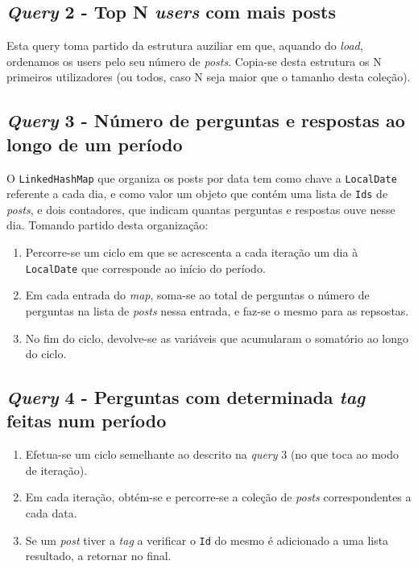 \documentclass[10pt]{article}
\begin{document}
	\subsection*{\textit{Query} 2 - Top N \textit{users} com mais posts}
			Esta query toma partido da estrutura auziliar em que,
		aquando do \textit{load}, ordenamos os users pelo seu 
		número de \textit{posts}. Copia-se desta estrutura os 
		N primeiros utilizadores (ou todos, caso N seja maior
		que o tamanho desta coleção).			
	\subsection*{\textit{Query} 3 - Número de perguntas e respostas ao longo de um período}
			O \texttt{LinkedHashMap} que organiza os posts por data
		tem como chave a \texttt{LocalDate} referente a cada dia, e 
		como valor um objeto que contém uma lista de \texttt{Ids} de
		\textit{posts}, e dois contadores, que indicam quantas 
		perguntas e respostas ouve nesse dia. Tomando partido desta 
		organização:
		\begin{enumerate}
			\item Percorre-se um ciclo em que se acrescenta a cada 
		iteração um dia à \texttt{LocalDate} que corresponde ao 
		início do período.
			\item Em cada entrada do \textit{map}, soma-se ao total
		de perguntas o número de perguntas na lista de \textit{posts} 
		nessa entrada, e faz-se o mesmo para as repsostas.
			\item No fim do ciclo, devolve-se as variáveis que 
		acumularam o somatório ao longo do ciclo.
		\end{enumerate}
	\subsection*{\textit{Query} 4 - Perguntas com determinada \textit{tag} feitas num período}
		\begin{enumerate}
			\item Efetua-se um ciclo semelhante ao descrito na 
		\textit{query} 3 (no que toca ao modo de iteração).
			\item Em cada iteração, obtém-se e percorre-se a coleção 
		de \textit{posts} correspondentes a cada data.
			\item Se um \textit{post} tiver a \textit{tag} a verificar 
		o \texttt{Id} do mesmo é adicionado a uma lista resultado, a
		retornar no final.

		\end{enumerate}
			
\end{document}
